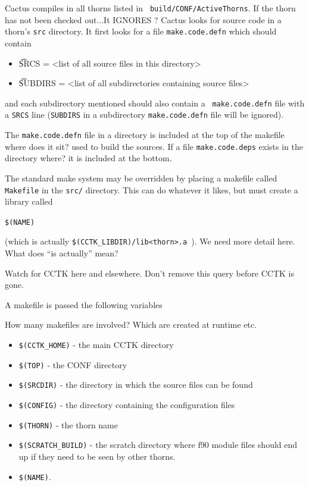 Cactus compiles in all thorns listed in {\tt
build/CONF/ActiveThorns}. {\q If the thorn has not been checked
out...It IGNORES ?} Cactus looks for source code in a thorn's {\tt src}
directory. It first looks for a file {\tt make.code.defn} which
should contain

\begin{itemize}

\item {\t SRCS = <list of all source files in this directory>}

\item {\t SUBDIRS = <list of all subdirectories containing source files>}

\end{itemize}

and each subdirectory mentioned should also contain a {\tt
make.code.defn} file with a {\tt SRCS} line ({\tt SUBDIRS} in a
subdirectory {\tt make.code.defn} file will be ignored).

The {\tt make.code.defn} file in a directory is included at the top of
the makefile {\q where does it sit?}  used to build the sources. If a
file {\tt make.code.deps} exists in the directory {\q where?} it is
included at the bottom.

The standard make system may be overridden by placing a makefile
called {\tt Makefile} in the {\tt src/} directory.  This can do
whatever it likes, but must create a library called

{\tt \$(NAME)}

(which is actually {\tt \$(CCTK\_LIBDIR)/lib<thorn>.a }). {\q We need more detail here. What does ``is
actually'' mean?}

{\q Watch for CCTK here and elsewhere. Don't remove this query before
CCTK is gone.}

A makefile is passed the following variables

{\q How many makefiles are involved? Which are created at runtime etc.}

\begin{itemize}

\item {\tt \$(CCTK\_HOME)} - the main CCTK directory

\item {\tt \$(TOP)}    - the CONF directory

\item {\tt \$(SRCDIR)} - the directory in which the source files can be found

\item {\tt \$(CONFIG)} - the directory containing the configuration files

\item {\tt \$(THORN)}  - the thorn name

\item {\tt \$(SCRATCH\_BUILD)} - the scratch directory where f90 module
files should end up if they need to be seen by other thorns.

\item {\tt \$(NAME)}.

\end{itemize}

